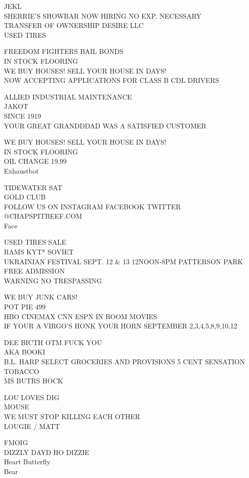 \documentclass[10pt,letterpaper]{article}
\begin{document}
JEKL\\
SHERRIE'S SHOWBAR NOW HIRING NO EXP. NECESSARY\\
TRANSFER OF OWNERSHIP DESIRE LLC\\
USED TIRES

FREEDOM FIGHTERS BAIL BONDS\\
IN STOCK FLOORING\\
WE BUY HOUSES!  SELL YOUR HOUSE IN DAYS!\\
NOW ACCEPTING APPLICATIONS FOR CLASS B CDL DRIVERS

ALLIED INDUSTRIAL MAINTENANCE\\
JAKOT\\
SINCE 1919\\
YOUR GREAT GRANDDDAD WAS A SATISFIED CUSTOMER

WE BUY HOUSES!  SELL YOUR HOUSE IN DAYS!\\
IN STOCK FLOORING\\
OIL CHANGE 19.99\\
Exhaustbot

TIDEWATER SAT\\
GOLD CLUB\\
FOLLOW US ON INSTAGRAM FACEBOOK TWITTER @CHAPSPITBEEF.COM\\
Face

USED TIRES SALE\\
RAMS KYT* SOVIET\\
UKRAINIAN FESTIVAL SEPT. 12 \& 13 12NOON{-}8PM PATTERSON PARK FREE ADMISSION\\
WARNING NO TRESPASSING

WE BUY JUNK CARS!\\
POT PIE 499\\
HBO CINEMAX CNN ESPN IN ROOM MOVIES\\
IF YOUR A VIRGO'S HONK YOUR HORN SEPTEMBER 2,3,4,5,8,9,10,12

DEE BICTH OTM FUCK YOU\\
AKA BOOKI\\
B.L. HARP SELECT GROCERIES AND PROVISIONS 5 CENT SENSATION TOBACCO\\
MS BUTRS HOCK

LOU LOVES DIG\\
MOUSE\\
WE MUST STOP KILLING EACH OTHER\\
LOUGIE / MATT

FMOIG\\
DIZZLY DAYD HO DIZZIE\\
Heart Butterfly\\
Bear
\end{document}
